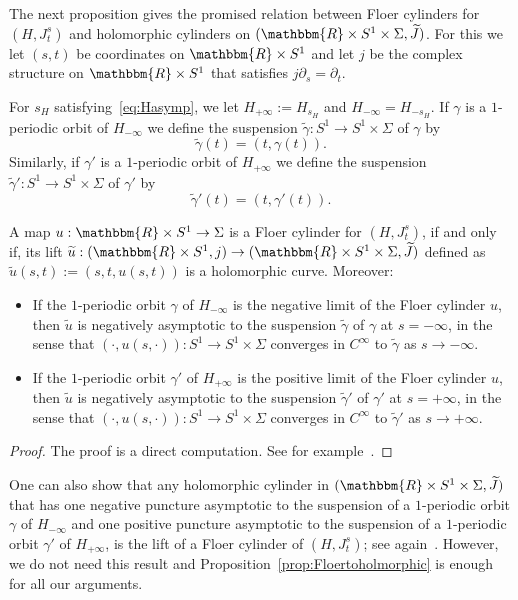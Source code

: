 \documentclass[AHL,Unicode,longabstracts,published]{cedram}
\newcommand{\R}{\mathbbm{R}}
\begin{document}
The next proposition gives the promised relation between Floer cylinders for $(H,J^s_t)$ and holomorphic cylinders on $(\R \times S^1 \times \Sigma,\widetilde{J})$. For this we let $(s,t)$ be coordinates on $\R \times S^1$ and let $j$ be the complex structure on $\R \times S^1$ that satisfies $j\partial_s= \partial_t$.

For $s_H$ satisfying~\eqref{eq:Hasymp}, we let $H_{+\infty}:= H_{s_H}$ and $H_{-\infty}= H_{-s_H}$.
If $\gamma$ is a $1$-periodic orbit of $H_{-\infty}$ we define the suspension $\widetilde{\gamma}:S^1 \to S^1\times \Sigma$ of $\gamma$ by
\[
\widetilde{\gamma}(t)=(t,\gamma(t)).
\]
Similarly, if $\gamma'$ is a $1$-periodic orbit of $H_{+\infty}$ we define the suspension $\widetilde{\gamma}':S^1 \to S^1\times \Sigma$ of $\gamma'$ by
\[
\widetilde{\gamma}'(t)=(t,\gamma'(t)).
\]

\begin{prop}\label{prop:Floertoholmorphic}
A map $u:\R \times S^1 \to \Sigma$ is a Floer cylinder for $(H,J^s_t)$, if and only if, its lift $\widetilde{u}: (\R \times S^1,j) \to (\R \times S^1 \times \Sigma,\widetilde{J})$ defined as $\widetilde{u}(s,t) := (s,t,u(s,t))$ is a holomorphic curve. Moreover:
\begin{itemize}
\item If the $1$-periodic orbit $\gamma$ of $H_{-\infty}$ is the negative limit of the Floer cylinder $u$, then $\widetilde{u}$ is negatively asymptotic to the suspension $\widetilde{\gamma}$ of $\gamma$ at $s=-\infty$, in the sense that $(\cdot,u(s,\cdot)): S^1 \to S^1 \times \Sigma$ converges in $C^\infty$ to $\widetilde{\gamma}$ as $s\to -\infty$.
\item If the $1$-periodic orbit $\gamma'$ of $H_{+\infty}$ is the positive limit of the Floer cylinder $u$, then $\widetilde{u}$ is negatively asymptotic to the suspension $\widetilde{\gamma}'$ of $\gamma'$ at $s=+\infty$, in the sense that $(\cdot,u(s,\cdot)): S^1 \to S^1 \times \Sigma$ converges in $C^\infty$ to $\widetilde{\gamma}'$ as $s\to +\infty$.
\end{itemize}
\end{prop}

\begin{proof}
The proof is a direct computation. See for example~\cite[Section~4.12]{EKP}. 
\end{proof}

\begin{rema}
One can also show that any holomorphic cylinder in $(\R \times S^1 \times \Sigma,\widetilde{J})$ that has one negative puncture asymptotic to the suspension of a $1$-periodic orbit $\gamma$ of $H_{-\infty}$ and one positive puncture asymptotic to the suspension of a $1$-periodic orbit $\gamma'$ of $H_{+\infty}$, is the lift of a Floer cylinder of $(H,J^{s}_t)$; see again~\cite[Section~4.12]{EKP}. However, we do not need this result and Proposition~\ref{prop:Floertoholmorphic} is enough for all our arguments.
\end{rema}
\end{document}
